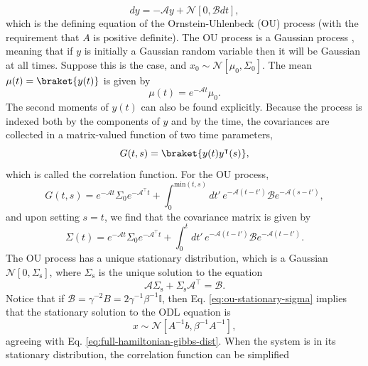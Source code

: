 \documentclass[prx,onecolumn,floatfix,longbibliography,notitlepage, nofootinbib,12pt]{revtex4-2}
\begin{document}
\begin{appendix}
\begin{equation}
\label{eq:odl-ou-process}
    dy = - \mathcal{A}y + \mathcal{N}[0, \mathcal{B} dt],
\end{equation}
which is the defining equation of the Ornstein-Uhlenbeck (OU) process (with the requirement that $A$ is positive definite). The OU process is a Gaussian process \cite{mackay1998introduction}, meaning that if $y$ is initially a Gaussian random variable then it will be Gaussian at all times. Suppose this is the case, and $x_0 \sim \mathcal{N}[\mu_0,\Sigma_0]$. The mean $\mu(t) = \braket{y(t)}$ is given by
\begin{equation}
\label{eq:ou-solution-mu}
    \mu(t) = e^{-\mathcal{A} t}\mu_0.
\end{equation}
The second moments of $y(t)$ can also be found explicitly. Because the process is indexed both by the components of $y$ and by the time, the covariances are collected in a matrix-valued function of two time parameters,
\begin{equation}
    G(t,s) = \braket{y(t)y^\intercal(s)},
\end{equation}
which is called the correlation function. For the OU process,
\begin{equation}
\label{eq:ou-solution-G}
    G(t,s) = e^{-\mathcal{A}t}\Sigma_0 e^{-\mathcal{A}^\intercal t} + \int_{0}^{\text{min}(t,s)} dt' \, e^{-\mathcal{A} (t-t')} \mathcal{B} e^{- \mathcal{A} (s - t')},
\end{equation}
and upon setting $s=t$, we find that the covariance matrix is given by
\begin{equation}
    \Sigma(t) = e^{-\mathcal{A} t}\Sigma_0 e^{-\mathcal{A}^\intercal t} + \int_{0}^{t} dt' \, e^{-\mathcal{A} (t-t')} \mathcal{B} e^{- \mathcal{A} (t - t')}.
\end{equation}
The OU process has a unique stationary distribution, which is a Gaussian $\mathcal{N}[0,\Sigma_\text{s}]$, where $\Sigma_\text{s}$ is the unique solution to the equation
\begin{equation}
\label{eq:ou-stationary-sigma}
 \mathcal{A} \Sigma_\text{s} + \Sigma_\text{s} \mathcal{A}^\intercal= \mathcal{B}.
\end{equation}
Notice that if $\mathcal{B} = \gamma^{-2}B = 2\gamma^{-1}\beta^{-1}\mathbb{I}$, then Eq. \eqref{eq:ou-stationary-sigma} implies that the stationary solution to the ODL equation is
\begin{equation}
   x \sim \mathcal{N}[A^{-1} b, \beta^{-1}A^{-1}],
\end{equation}
agreeing with Eq. \eqref{eq:full-hamiltonian-gibbs-dist}. When the system is in its stationary distribution, the correlation function can be simplified

\end{appendix}
\end{document}
